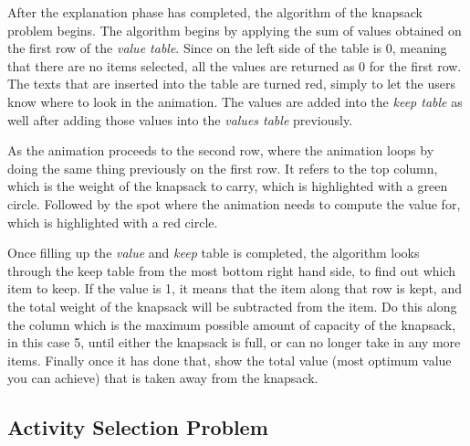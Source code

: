 After the explanation phase has completed, the algorithm of the knapsack problem begins. The algorithm begins by applying the sum of values obtained on the first row of the \textit{value table}. Since on the left side of the table is 0, meaning that there are no items selected, all the values are returned as 0 for the first row. The texts that are inserted into the table are turned red, simply to let the users know where to look in the animation. The values are added into the \textit{keep table} as well after adding those values into the \textit{values table} previously.

As the animation proceeds to the second row, where the animation loops by doing the same thing previously on the first row. It refers to the top column, which is the weight of the knapsack to carry, which is highlighted with a green circle. Followed by the spot where the animation needs to compute the value for, which is highlighted with a red circle. 

Once filling up the \textit{value} and \textit{keep} table is completed, the algorithm looks through the keep table from the most bottom right hand side, to find out which item to keep. If the value is 1, it means that the item along that row is kept, and the total weight of the knapsack will be subtracted from the item. Do this along the column which is the maximum possible amount of capacity of the knapsack, in this case 5, until either the knapsack is full, or can no longer take in any more items. Finally once it has done that, show the total value (most optimum value you can achieve) that is taken away from the knapsack.

\newpage

\subsection{Activity Selection Problem}


